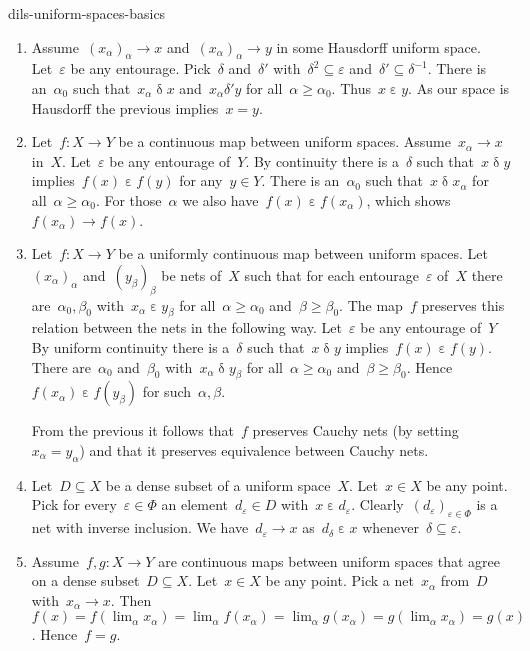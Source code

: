 \begin{solution}{dils-uniform-spaces-basics}
\begin{enumerate}
\item
    Assume~$(x_\alpha)_\alpha \to x$ and~$(x_\alpha)_\alpha \to y$
            in some Hausdorff uniform space.
    Let~$\varepsilon$ be any entourage.
        Pick~$\delta$ and~$\delta'$ with~$\delta^2 \subseteq \varepsilon$
        and~$\delta'\subseteq \delta^{-1}$.
    There is an~$\alpha_0$ such that~$x_\alpha \mathrel\delta x$
        and~$x_\alpha \mathrel{\delta'} y$
        for all~$\alpha \geq \alpha_0$.
    Thus~$x \mathrel\varepsilon y$.
    As our space is Hausdorff the previous implies~$x=y$.
\item
    Let~$f\colon X\to Y$ be a continuous map between uniform spaces.
    Assume~$x_\alpha \to x$ in~$X$.
    Let~$\varepsilon$ be any entourage of~$Y$.
By continuity there is a~$\delta$
    such that~$x \mathrel\delta y$ implies~$f(x) \mathrel{\varepsilon} f(y)$
    for any~$y \in Y$.
There is an~$\alpha_0$ such that~$x \mathrel{\delta} x_\alpha$
    for all~$\alpha \geq \alpha_0$.
For those~$\alpha$ we also have~$f(x) \mathrel{\varepsilon} f(x_\alpha)$,
    which shows~$f(x_\alpha) \to f(x)$.
\item
    Let~$f\colon X\to Y$ be a uniformly continuous map
        between uniform spaces.
Let~$(x_\alpha)_\alpha$ and~$(y_\beta)_\beta$
    be nets of~$X$
    such that for each entourage~$\varepsilon$ of~$X$
        there are~$\alpha_0,\beta_0$ with~$x_\alpha \mathrel\varepsilon y_\beta$
        for all~$\alpha\geq\alpha_0$ and~$\beta \geq \beta_0$.
The map~$f$ preserves this relation between the nets
    in the following way.
Let~$\varepsilon$ be any entourage of~$Y$
By uniform continuity there is a~$\delta$
    such that~$x \mathrel\delta y$ implies~$f(x) \mathrel\varepsilon f(y)$.
There are~$\alpha_0$ and~$\beta_0$
    with~$x_\alpha \mathrel\delta y_\beta$ for all~$\alpha \geq\alpha_0$
    and~$\beta \geq\beta_0$.
    Hence~$f(x_\alpha) \mathrel\varepsilon f(y_\beta)$
        for such~$\alpha,\beta$.

From the previous it follows that~$f$
    preserves Cauchy nets (by setting~$x_\alpha=y_\alpha$)
    and that it preserves equivalence between Cauchy nets.
\item
Let~$D \subseteq X$ be a dense subset of a uniform space~$X$.
Let~$x \in X$ be any point.
Pick for every~$\varepsilon \in \Phi$
    an element~$d_\varepsilon \in D$
    with~$x \mathrel\varepsilon d_\varepsilon$.
Clearly~$(d_\varepsilon)_{\varepsilon\in\Phi}$ is a net with inverse
inclusion. We have~$d_\varepsilon \to x$
    as~$d_\delta \mathrel\varepsilon x$
    whenever~$\delta \subseteq \varepsilon$.
\item
Assume~$f,g\colon X \to Y$ are continuous maps between uniform
    spaces that agree on a dense subset~$D \subseteq X$.
Let~$x\in X$ be any point.
Pick a net~$x_\alpha$ from~$D$ with~$x_\alpha \to x$.
Then~$f(x) = f(\lim_\alpha x_\alpha) = \lim_\alpha f(x_\alpha)
    =  \lim_\alpha g(x_\alpha) = g(\lim_\alpha x_\alpha) = g(x)$.
    Hence~$f=g$.
\end{enumerate}
\end{solution}
